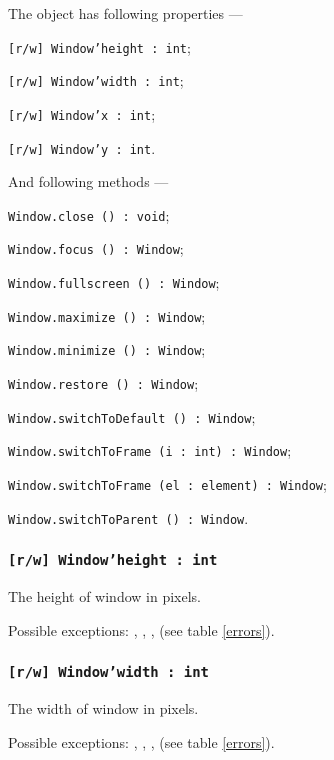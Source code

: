 The object \window{} has following properties —
\begin{icItems}
	\item \texttt{[r/w] Window'height : int};
	\item \texttt{[r/w] Window'width : int};
	\item \texttt{[r/w] Window'x : int};
	\item \texttt{[r/w] Window'y : int}.
\end{icItems}

And following methods —
\begin{icItems}
	\item \texttt{Window.close () : void};
	\item \texttt{Window.focus () : Window};
	\item \texttt{Window.fullscreen () : Window};
	\item \texttt{Window.maximize () : Window};
	\item \texttt{Window.minimize () : Window};
	\item \texttt{Window.restore () : Window};
	\item \texttt{Window.switchToDefault () : Window};
	\item \texttt{Window.switchToFrame (i : int) : Window};
	\item \texttt{Window.switchToFrame (el : element) : Window};
	\item \texttt{Window.switchToParent () : Window}.
\end{icItems}

\subsubsection{\texttt{[r/w] Window'height : int}}

The height of window in pixels.

Possible exceptions: , , ,  (see table \ref{errors}).

\subsubsection{\texttt{[r/w] Window'width : int}}

The width of window in pixels.

Possible exceptions: , , ,  (see table \ref{errors}).

